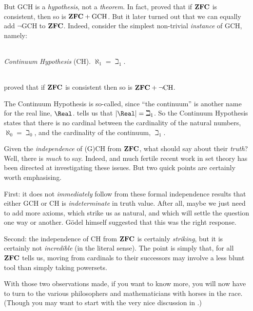 \documentclass[../../../include/open-logic-section]{subfiles}
\begin{document}
But GCH is a \emph{hypothesis}, not a \emph{theorem}. In fact,
\citet{Godel1938} proved that if $\mathbf{ZFC}$ is consistent, then so is
$\mathbf{ZFC} + \text{GCH}$. But it later turned out that we can equally add
$\lnot$GCH to $\mathbf{ZFC}$. Indeed, consider the simplest non-trivial
\emph{instance} of GCH, namely: 

\
\\\emph{Continuum Hypothesis} (CH). $\aleph_1 = \beth_1$. 

\
\\
\citet{Cohen1963} proved that if $\mathbf{ZFC}$ is consistent then so is $\mathbf{ZFC}
+ \lnot\text{CH}$. 

The Continuum Hypothesis is so-called, since ``the continuum'' is
another name for the real line, $\Real$.
\olref[opps]{continuumis2aleph0} tells us that $\card{\Real} =
\beth_1$. So the Continuum Hypothesis states that there is no cardinal
between the cardinality of the natural numbers, $\aleph_0 = \beth_0$,
and the cardinality of the continuum, $\beth_1$.

Given the \emph{independence} of (G)CH from $\mathbf{ZFC}$, what should say
about their \emph{truth}? Well, there is \emph{much} to say. Indeed,
and much fertile recent work in set theory has been directed at
investigating these issues. But two quick points are certainly worth
emphasising. 

First: it does not \emph{immediately} follow from these formal
independence results that either GCH or CH is \emph{indeterminate} in
truth value. After all, maybe we just need to add more axioms, which
strike us as natural, and which will settle the question one way or
another. G\"odel himself suggested that this was the right response. 

Second: the independence of CH from $\mathbf{ZFC}$ is certainly
\emph{striking}, but it is certainly not \emph{incredible} (in the
literal sense). The point is simply that, for all $\mathbf{ZFC}$ tells us,
moving from cardinals to their successors may involve a less blunt
tool than simply taking powersets.

With those two observations made, if you want to know more, you will
now have to turn to the various philosophers and mathematicians with
horses in the race. (Though you may want to start with the very nice
discussion in \citeauthor{Potter2004} \citeyear[\S15.6]{Potter2004}.) 
\end{document}
